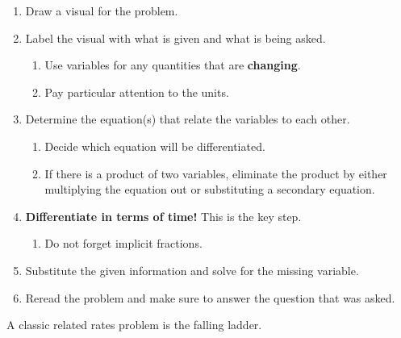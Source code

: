 \begin{enumerate}[label=\arabic*.]
    \item Draw a visual for the problem. 
    \item Label the visual with what is given and what is being asked. 
    \begin{enumerate}[label=\alph*.]
        \item Use variables for any quantities that are \textbf{changing}. 
        \item Pay particular attention to the units.
    \end{enumerate}
    \item Determine the equation(s) that relate the variables to each other.
    \begin{enumerate}[label=\alph*.]
        \item Decide which equation will be differentiated.
        \item If there is a product of two variables, eliminate the product by either multiplying the equation out or substituting a secondary equation.
    \end{enumerate}
    \item \textbf{Differentiate in terms of time!} This is the key step.
    \begin{enumerate}[label=\alph*.]
        \item Do not forget implicit fractions.
    \end{enumerate}
    \item Substitute the given information and solve for the missing variable.
    \item Reread the problem and make sure to answer the question that was asked.
\end{enumerate} \vspace{11pt}

A classic related rates problem is the falling ladder. 

